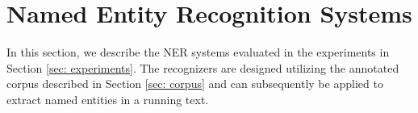 \documentclass[11pt]{article}
\begin{document}







\section{Named Entity Recognition Systems}
\label{sec: named entity recognizers}

In this section, we describe the NER systems evaluated in the experiments in Section \ref{sec: experiments}. The recognizers are designed utilizing the annotated corpus described in Section \ref{sec: corpus} and can subsequently be applied to extract named entities in a running text. 
\end{document}
